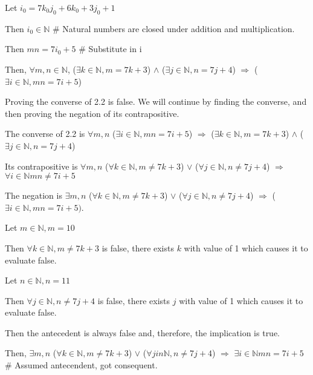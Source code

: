 \documentclass{article}
\begin{document}
\begin{enumerate}
\begin{description}
\begin{description}
						\item Let $i_0 = 7k_0j_0 + 6k_0 + 3j_0 + 1$
						\item Then $i_0 \in \mathbb{N}$ \# Natural numbers are closed under addition and multiplication.
						\item Then $mn = 7i_0 + 5$ \# Substitute in i
						\end{description}
				\item Then, $\forall m,n \in \mathbb{N}$, ($\exists k \in \mathbb{N}, m = 7k + 3$) $\wedge$ ($\exists j \in \mathbb{N}, n = 7j + 4$) $\Rightarrow$ ($\exists i \in \mathbb{N}, mn = 7i + 5$)
		\end{description}
\item Proving the converse of 2.2 is false. We will continue by finding the converse, and then proving the negation of its contrapositive.
\begin{description}
		\item The converse of 2.2 is $\forall m,n$ ($\exists i \in \mathbb{N}, mn = 7i + 5$) $\Rightarrow$ ($\exists k \in \mathbb{N}, m = 7k + 3$) $\wedge$ ($\exists j \in \mathbb{N}, n = 7j + 4$)
		\item Its contrapositive is $\forall m,n$ ($\forall k \in \mathbb{N}, m \neq 7k+3$) $\vee$ ($\forall j \in \mathbb{N}, n \neq 7j + 4$) $\Rightarrow$ $\forall i \in \mathbb{N} mn \neq 7i + 5$
		\item The negation is $\exists m,n$ ($\forall k \in \mathbb{N}, m \neq 7k + 3$) $\vee$ ($\forall j \in \mathbb{N}, n \neq 7j + 4$) $\Rightarrow$ ($\exists i \in \mathbb{N}, mn = 7i + 5)$.
		\begin{description}
			\item Let $m \in \mathbb{N}, m = 10$
			\item Then $\forall k \in \mathbb{N}, m \neq 7k + 3$ is false, there exists $k$ with value of 1 which causes it to evaluate false.
			\item Let $n \in \mathbb{N}, n = 11$
			\item Then $\forall j \in \mathbb{N}, n \neq 7j + 4$ is false, there exists $j$ with value of 1 which causes it to evaluate false. 
			\item Then the antecedent is always false and, therefore, the implication is true.
		\end{description}
		\item Then, $\exists m,n$ ($\forall k \in \mathbb{N}, m \neq 7k + 3$) $\vee$ ($\forall j in \mathbb{N}, n \neq 7j + 4$) $\Rightarrow$ $\exists i \in \mathbb{N} mn = 7i + 5$ \# Assumed antecendent, got consequent.
\end{description}
\end{enumerate}
\end{document}

